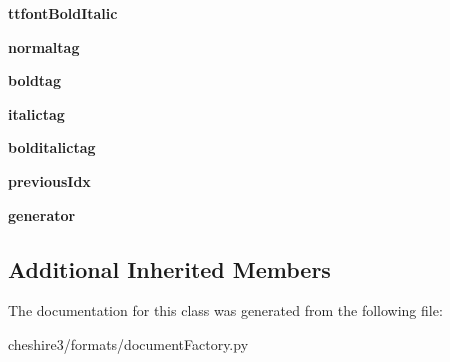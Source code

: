 \begin{DoxyCompactItemize}
\item 
\hypertarget{classcheshire3_1_1formats_1_1document_factory_1_1_report_lab_document_factory_a434cbd30dfc14a47dd90a421872c40db}{{\bfseries ttfont\-Bold\-Italic}}\label{classcheshire3_1_1formats_1_1document_factory_1_1_report_lab_document_factory_a434cbd30dfc14a47dd90a421872c40db}

\item 
\hypertarget{classcheshire3_1_1formats_1_1document_factory_1_1_report_lab_document_factory_ad26c3c175d811512c76d792701f3b515}{{\bfseries normaltag}}\label{classcheshire3_1_1formats_1_1document_factory_1_1_report_lab_document_factory_ad26c3c175d811512c76d792701f3b515}

\item 
\hypertarget{classcheshire3_1_1formats_1_1document_factory_1_1_report_lab_document_factory_a391bb1c35a92796d6aa77d8d83f3f2d2}{{\bfseries boldtag}}\label{classcheshire3_1_1formats_1_1document_factory_1_1_report_lab_document_factory_a391bb1c35a92796d6aa77d8d83f3f2d2}

\item 
\hypertarget{classcheshire3_1_1formats_1_1document_factory_1_1_report_lab_document_factory_aaf4423bd61c6e6d63fc4c040a101eb34}{{\bfseries italictag}}\label{classcheshire3_1_1formats_1_1document_factory_1_1_report_lab_document_factory_aaf4423bd61c6e6d63fc4c040a101eb34}

\item 
\hypertarget{classcheshire3_1_1formats_1_1document_factory_1_1_report_lab_document_factory_a192559c69ef7637f9959b3c5fdaaa83f}{{\bfseries bolditalictag}}\label{classcheshire3_1_1formats_1_1document_factory_1_1_report_lab_document_factory_a192559c69ef7637f9959b3c5fdaaa83f}

\item 
\hypertarget{classcheshire3_1_1formats_1_1document_factory_1_1_report_lab_document_factory_a33d395a07fff2967bc9c23acf8fa832d}{{\bfseries previous\-Idx}}\label{classcheshire3_1_1formats_1_1document_factory_1_1_report_lab_document_factory_a33d395a07fff2967bc9c23acf8fa832d}

\item 
\hypertarget{classcheshire3_1_1formats_1_1document_factory_1_1_report_lab_document_factory_ac65a0cd9af10ad7e8f6b8ea653b0c701}{{\bfseries generator}}\label{classcheshire3_1_1formats_1_1document_factory_1_1_report_lab_document_factory_ac65a0cd9af10ad7e8f6b8ea653b0c701}

\end{DoxyCompactItemize}
\subsection*{Additional Inherited Members}


The documentation for this class was generated from the following file\-:\begin{DoxyCompactItemize}
\item 
cheshire3/formats/document\-Factory.\-py\end{DoxyCompactItemize}
